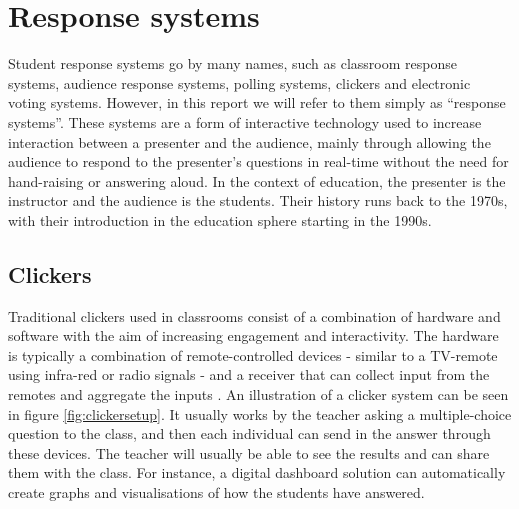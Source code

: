 




\section{Response systems}\label{sec:responsesystems}
Student response systems go by many names, such as classroom response systems, audience response systems, polling systems, clickers and electronic voting systems. However, in this report we will refer to them simply as ``response systems''. These systems are a form of interactive technology used to increase interaction between a presenter and the audience, mainly through allowing the audience to respond to the presenter's questions in real-time without the need for hand-raising or answering aloud. In the context of education, the presenter is the instructor and the audience is the students. Their history runs back to the 1970s, with their introduction in the education sphere starting in the 1990s. \cite{resyslitrev}

\subsection{Clickers}
Traditional clickers used in classrooms consist of a combination of hardware and software with the aim of increasing engagement and interactivity. The hardware is typically a combination of remote-controlled devices - similar to a TV-remote using infra-red or radio signals - and a receiver that can collect input from the remotes and aggregate the inputs \cite{shi2023}. An illustration of a clicker system can be seen in figure \ref{fig:clickersetup}. It usually works by the teacher asking a multiple-choice question to the class, and then each individual can send in the answer through these devices. The teacher will usually be able to see the results and can share them with the class. For instance, a digital dashboard solution can automatically create graphs and visualisations of how the students have answered. 

